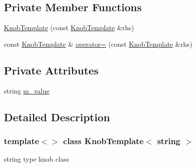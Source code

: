 \subsection*{Private Member Functions}
\begin{DoxyCompactItemize}
\item 
\hyperlink{classKnobTemplate_3_01string_01_4_a15edde26af3fe3516ef60301368b5d31}{KnobTemplate} (const \hyperlink{classKnobTemplate}{KnobTemplate} \&rhs)
\item 
const \hyperlink{classKnobTemplate}{KnobTemplate} \& \hyperlink{classKnobTemplate_3_01string_01_4_a9c99e9b3292d1df82c49b9b61159f0f7}{operator=} (const \hyperlink{classKnobTemplate}{KnobTemplate} \&rhs)
\end{DoxyCompactItemize}
\subsection*{Private Attributes}
\begin{DoxyCompactItemize}
\item 
string \hyperlink{classKnobTemplate_3_01string_01_4_a109a8b0e27146550576ef4e5a7babeac}{m\_\-value}
\end{DoxyCompactItemize}


\subsection{Detailed Description}
\subsubsection*{template$<$$>$ class KnobTemplate$<$ string $>$}

string type knob class 

